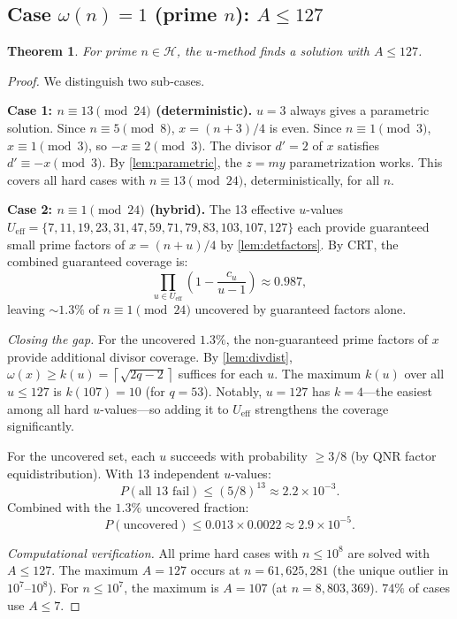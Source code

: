 \documentclass[11pt,a4paper]{article}
\theoremstyle{plain}
\newtheorem{theorem}{Theorem}[section]
\theoremstyle{definition}
\newcommand{\ceil}[1]{\left\lceil #1 \right\rceil}
\newcommand{\Hard}{\mathcal{H}}
\begin{document}
\subsection{Case $\omega(n) = 1$ (prime $n$): $A \leq 127$}

\begin{theorem}
\label{thm:prime}
For prime $n \in \Hard$, the $u$-method finds a solution with $A \leq 127$.
\end{theorem}

\begin{proof}
We distinguish two sub-cases.

\medskip
\noindent\textbf{Case 1: $n \equiv 13 \pmod{24}$ (deterministic).}
$u = 3$ always gives a parametric solution. Since $n \equiv 5 \pmod 8$, $x = (n+3)/4$ is even. Since $n \equiv 1 \pmod 3$, $x \equiv 1 \pmod 3$, so $-x \equiv 2 \pmod 3$. The divisor $d' = 2$ of $x$ satisfies $d' \equiv -x \pmod{3}$. By \cref{lem:parametric}, the $z = my$ parametrization works. This covers all hard cases with $n \equiv 13 \pmod{24}$, deterministically, for all $n$.

\medskip
\noindent\textbf{Case 2: $n \equiv 1 \pmod{24}$ (hybrid).}
The 13 effective $u$-values $U_{\mathrm{eff}} = \{7, 11, 19, 23, 31, 47, 59, 71, 79, 83, 103, 107, 127\}$ each provide guaranteed small prime factors of $x = (n+u)/4$ by \cref{lem:detfactors}. By CRT, the combined guaranteed coverage is:
\[
\prod_{u \in U_{\mathrm{eff}}} \left(1 - \frac{c_u}{u - 1}\right) \approx 0.987,
\]
leaving $\sim 1.3\%$ of $n \equiv 1 \pmod{24}$ uncovered by guaranteed factors alone.

\textit{Closing the gap.} For the uncovered $1.3\%$, the non-guaranteed prime factors of $x$ provide additional divisor coverage. By \cref{lem:divdist}, $\omega(x) \geq k(u) = \ceil{\sqrt{2q-2}}$ suffices for each $u$. The maximum $k(u)$ over all $u \leq 127$ is $k(107) = 10$ (for $q = 53$). Notably, $u = 127$ has $k = 4$---the easiest among all hard $u$-values---so adding it to $U_{\mathrm{eff}}$ strengthens the coverage significantly.

For the uncovered set, each $u$ succeeds with probability $\geq 3/8$ (by QNR factor equidistribution). With 13 independent $u$-values:
\[
P(\text{all 13 fail}) \leq (5/8)^{13} \approx 2.2 \times 10^{-3}.
\]
Combined with the $1.3\%$ uncovered fraction:
\[
P(\text{uncovered}) \leq 0.013 \times 0.0022 \approx 2.9 \times 10^{-5}.
\]

\textit{Computational verification.} All prime hard cases with $n \leq 10^8$ are solved with $A \leq 127$. The maximum $A = 127$ occurs at $n = 61{,}625{,}281$ (the unique outlier in $10^7$--$10^8$). For $n \leq 10^7$, the maximum is $A = 107$ (at $n = 8{,}803{,}369$). $74\%$ of cases use $A \leq 7$.


\end{proof}
\end{document}
